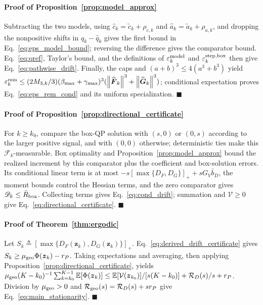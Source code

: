 \documentclass[journal]{IEEEtran}
\theoremstyle{remark}
\newcommand{\E}{\mathbb{E}}
\newcommand{\norm}[1]{\left\lVert #1\right\rVert}
\newcommand{\bz}{\boldsymbol{z}}
\newcommand{\hatF}{\widehat{\boldsymbol{F}}}
\newcommand{\hatG}{\widehat{\boldsymbol{G}}}
\newcommand{\Vk}{\mathcal{V}}
\begin{document}
	\paragraph{Proof of Proposition~\ref{prop:model_approx}}\label{app:model_approx}
	Subtracting the two models, using $\hat c_k=\tilde c_k+\rho_{c,k}$ and $\hat a_k=\tilde a_k+\rho_{a,k}$, and dropping the nonpositive shifts in $q_k-\hat q_k$ gives the first bound in Eq.~\eqref{eq:eps_model_bound}; reversing the difference gives the comparator bound. Eq.~\eqref{eq:qref}, Taylor's bound, and the definitions of $\varepsilon_k^{\rm model}$ and $\varepsilon_k^{\rm step,box}$ then give Eq.~\eqref{eq:pathwise_drift}. Finally, the caps and $(a+b)^3\le4(a^3+b^3)$ yield
	$\varepsilon_k^{\rm rem}\le(2M_{3,k}/3)(\beta_{\max}+\gamma_{\max})^3(\norm{\hatF_k}^3+\norm{\hatG_k}^3)$; conditional expectation proves Eq.~\eqref{eq:eps_rem_cond} and its uniform specialization.
	\hfill$\blacksquare$
	
	\paragraph{Proof of Proposition~\ref{prop:directional_certificate}}\label{app:directional_certificate}
	For $k\ge k_0$, compare the box-QP solution with $(s,0)$ or $(0,s)$ according to the larger positive signal, and with $(0,0)$ otherwise; deterministic ties make this $\mathscr F_k$-measurable. Box optimality and Proposition~\ref{prop:model_approx} bound the realized increment by this comparator plus the coefficient and box-solution errors. Its conditional linear term is at most $-s[\max\{D_F,D_G\}]_++sG_V\bar b_D$, the moment bounds control the Hessian terms, and the zero comparator gives $\mathscr D_k\le\bar R_{\rm box}$. Collecting terms gives Eq.~\eqref{eq:cond_drift}; summation and $\Vk\ge0$ give Eq.~\eqref{eq:directional_certificate}.
	\hfill$\blacksquare$
	
	\paragraph{Proof of Theorem~\ref{thm:ergodic}}\label{app:ergodic}
	Let $S_k\triangleq[\max\{D_F(\bz_k),D_G(\bz_k)\}]_+$.
	Eq.~\eqref{eq:derived_drift_certificate} gives $S_k\ge\mu_{\rm geo}\Phi(\bz_k)-r_P$.
	Taking expectations and averaging, then applying Proposition~\ref{prop:directional_certificate}, yields $\mu_{\rm geo}(K-k_0)^{-1}\sum_{k=k_0}^{K-1}\E[\Phi(\bz_k)]\le \E[\Vk(\bz_{k_0})]/[s(K-k_0)]+\mathcal R_D(s)/s+r_P$.
	Division by $\mu_{\rm geo}>0$ and $\mathcal R_{\rm geo}(s)=\mathcal R_D(s)+sr_P$ give Eq.~\eqref{eq:main_stationarity}.
	\hfill$\blacksquare$
\end{document}
